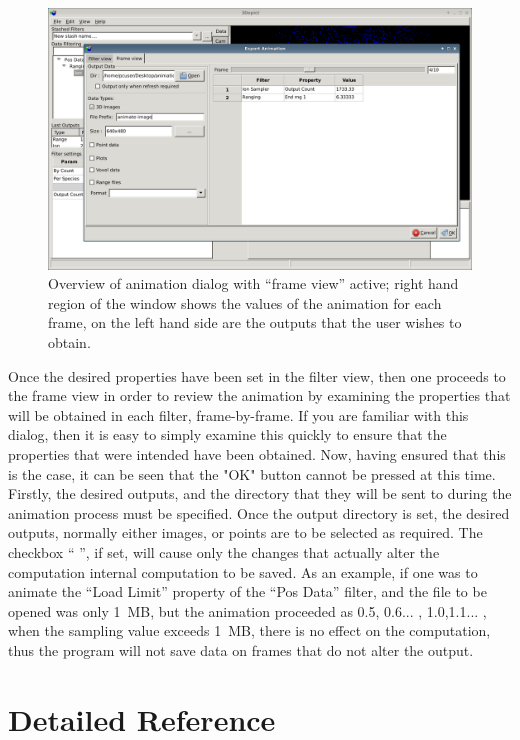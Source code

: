 \documentclass[10pt]{article}
\begin{document}
\begin{figure}
\begin{center}
 \includegraphics[width=0.9 \textwidth,keepaspectratio=true]{./figures/exportanimDialogFrameView.png}
 \caption{Overview of animation dialog with ``frame view'' active; right hand region of the window shows the values of the animation for each frame, on the left hand side are the outputs that the user wishes to obtain.}
\label{fig:animateFrameView}
\end{center}
\end{figure}

Once the desired properties have been set in the filter view, then one proceeds to the frame view in order to review the animation by examining the properties that will be obtained in each filter, frame-by-frame. If you are familiar with this dialog, then it is easy to simply examine this quickly to ensure that the properties that were intended have been obtained. Now, having ensured that this is the case, it can be seen that the "OK" button cannot be pressed at this time. Firstly, the desired outputs, and the directory that they will be sent to during the animation process must be specified. Once the output directory is set, the desired outputs, normally either images, or points are to be selected as required. The checkbox `` '',  if set, will cause only the changes that actually alter the computation internal computation to be saved. As an example, if one was to animate the ``Load Limit'' property of the ``Pos Data'' filter, and the file to be opened was only 1~MB, but the animation proceeded as 0.5, 0.6...
,
 1.0,1.1... , when the sampling value exceeds 1~MB, there is no effect on the computation, thus the program will not save data on frames that do not alter the output.

\section{Detailed Reference}
\end{document}
